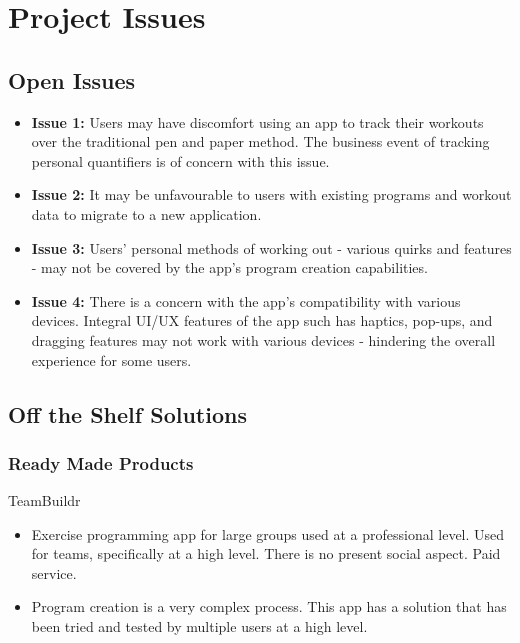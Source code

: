 \documentclass[12pt]{article}
\begin{document}
	\newpage
	
	\section{Project Issues}
		\subsection{Open Issues}
			\begin{itemize}
				\item \textbf{Issue 1:} Users may have discomfort using an app to track their workouts over the traditional pen and paper method. The business event of tracking personal quantifiers is of concern with this issue.
				
				\item \textbf{Issue 2:} It may be unfavourable to users with existing programs and workout data to migrate to a new application.
				
				\item \textbf{Issue 3:} Users' personal methods of working out - various quirks and features - may not be covered by the app's program creation capabilities.
				
				\item \textbf{Issue 4:} There is a concern with the app’s compatibility with various devices. Integral UI/UX features of the app such has haptics, pop-ups, and dragging features may not work with various devices - hindering the overall experience for some users.
				
			\end{itemize}
		
		\subsection{Off the Shelf Solutions}
			\subsubsection{Ready Made Products}
		
				\noindent TeamBuildr
				\begin{itemize}
				\item Exercise programming app for large groups used at a professional level. Used for teams, specifically at a high level. There is no present social aspect. Paid service. 
				\item Program creation is a very complex process. This app has a solution that has been tried and tested by multiple users at a high level. 
				\end{itemize}
				
\end{document}
